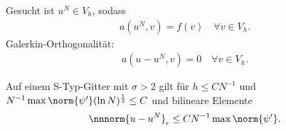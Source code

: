 Gesucht ist $u^{N} \in V_{h}$, sodass
\begin{align*}
  a(u^{N}, v) = f(v)  \quad \forall v \in V_{h}. 
\end{align*}
Galerkin-Orthogonalität:
\begin{align*}
  a(u - u^{N}, v) = 0 \quad \forall v \in V_{h}. 
\end{align*}
\begin{satz}\label{thm:7-13}
  Auf einem S-Typ-Gitter mit $\sigma > 2$ gilt für $h \leq CN^{-1}$ und $N^{-1} \max \norm{\psi'} (\ln N)^{\frac 12} \leq C$ und bilineare Elemente
  \begin{align*}
    \nnnorm{u - u^{N}}_{\epsilon} \leq C N^{-1}\max\norm{\psi'}. 
  \end{align*}

\end{satz}
